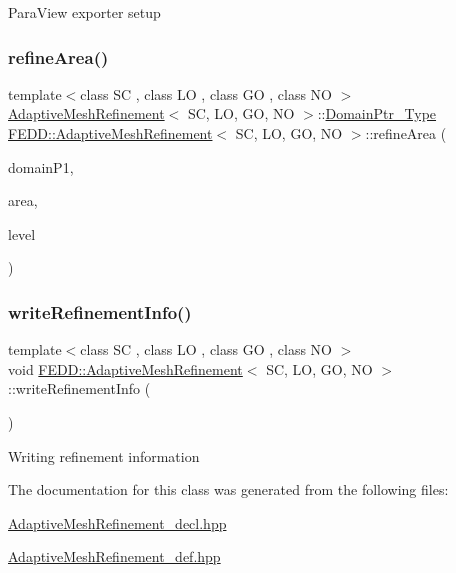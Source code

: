 Para\+View exporter setup \mbox{\label{classFEDD_1_1AdaptiveMeshRefinement_abbff0752b1d6febdb36194e379e8b876}} 
\subsubsection{\texorpdfstring{refine\+Area()}{refineArea()}}
{\footnotesize\ttfamily template$<$class SC , class LO , class GO , class NO $>$ \\
\hyperlink{classFEDD_1_1AdaptiveMeshRefinement}{Adaptive\+Mesh\+Refinement}$<$ SC, LO, GO, NO $>$\+::\hyperlink{classFEDD_1_1AdaptiveMeshRefinement_a98b097661d0e4c38e4182582078e2cd6}{Domain\+Ptr\+\_\+\+Type} \hyperlink{classFEDD_1_1AdaptiveMeshRefinement}{F\+E\+D\+D\+::\+Adaptive\+Mesh\+Refinement}$<$ SC, LO, GO, NO $>$\+::refine\+Area (\begin{DoxyParamCaption}\item[{\hyperlink{classFEDD_1_1AdaptiveMeshRefinement_a98b097661d0e4c38e4182582078e2cd6}{Domain\+Ptr\+\_\+\+Type}}]{domain\+P1,  }\item[{vec2\+D\+\_\+dbl\+\_\+\+Type}]{area,  }\item[{int}]{level }\end{DoxyParamCaption})}

\mbox{\label{classFEDD_1_1AdaptiveMeshRefinement_a7103d3aaea99021774a69bb80a6b0044}} 
\subsubsection{\texorpdfstring{write\+Refinement\+Info()}{writeRefinementInfo()}}
{\footnotesize\ttfamily template$<$class SC , class LO , class GO , class NO $>$ \\
void \hyperlink{classFEDD_1_1AdaptiveMeshRefinement}{F\+E\+D\+D\+::\+Adaptive\+Mesh\+Refinement}$<$ SC, LO, GO, NO $>$\+::write\+Refinement\+Info (\begin{DoxyParamCaption}{ }\end{DoxyParamCaption})}

Writing refinement information 

The documentation for this class was generated from the following files\+:\begin{DoxyCompactItemize}
\item 
\hyperlink{AdaptiveMeshRefinement__decl_8hpp}{Adaptive\+Mesh\+Refinement\+\_\+decl.\+hpp}\item 
\hyperlink{AdaptiveMeshRefinement__def_8hpp}{Adaptive\+Mesh\+Refinement\+\_\+def.\+hpp}\end{DoxyCompactItemize}
